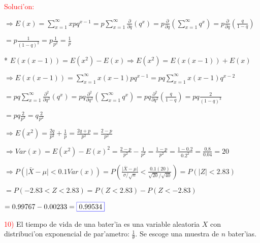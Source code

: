 \documentclass{article}
\providecommand{\abs}[1]{\lvert#1\rvert}
\begin{document}
\textcolor{red}{Soluci'on:}
\vspace{3mm}

$\Longrightarrow E(x) = \sum_{x = 1}^{\infty} xpq^{x-1} = p\sum_{x = 1}^{\infty} \frac{\partial}{\partial q} (q^{x}) = p\frac{\partial}{\partial q} (\sum_{x = 1}^{\infty} q^{x}) = p\frac{\partial}{\partial q} (\frac{q}{1-q})$ 
\vspace{2mm}

$= p\frac{1}{(1-q)^{2}} = p\frac{1}{p^{2}} = \frac{1}{p}$
\vspace{5mm}

* $E(x(x-1)) = E(x^{2})-E(x) \Longrightarrow E(x^{2}) = E(x(x-1)) + E(x)$
\vspace{5mm}

$\Longrightarrow E(x(x-1)) = \sum_{x = 1}^{\infty} x(x-1)pq^{x-1} = pq\sum_{x = 1}^{\infty} x(x-1)q^{x-2}$ 
\vspace{2mm}

$= pq\sum_{x = 1}^{\infty} \frac{\partial^{2}}{\partial q^{2}} (q^{x}) = pq\frac{\partial^{2}}{\partial q^{2}} (\sum_{x = 1}^{\infty} q^{x}) = pq\frac{\partial^{2}}{\partial q^{2}} (\frac{q}{1-q}) = pq\frac{2}{(1-q)^{3}}$ 
\vspace{2mm}

$= pq\frac{2}{p^{3}} = q\frac{2}{p^{2}}$ 
\vspace{5mm}

$\Longrightarrow E(x^{2}) = \frac{2q}{p^{2}} + \frac{1}{p} = \frac{2q+p}{p^{2}} = \frac{2-p}{p^{2}}$
\vspace{4mm}

$\Longrightarrow Var(x) = E(x^{2}) - E(x)^{2} = \frac{2-p}{p^{2}} - \frac{1}{p^{2}} = \frac{1-p}{p^{2}} = \frac{1-0.2}{0.2^{2}} = \frac{0.8}{0.04} = 20$
\vspace{4mm}

$\Longrightarrow P(\abs{\bar{X}-\mu}<0.1Var(x)) =  P(\frac{\abs{\bar{X}-\mu}}{\sigma/\sqrt{n}}<\frac{0.1(20)}{\sqrt{20}/\sqrt{40}}) = P(\abs{Z}<2.83)$
\vspace{3mm}

$= P(-2.83<Z<2.83) = P(Z<2.83)-P(Z<-2.83)$
\vspace{3mm}

$= 0.99767-0.00233 = \fcolorbox{blue}{white}{0.99534}$
\vspace{10mm}

\textcolor{red}{10)} El tiempo de vida de una bater'ia es una variable aleatoria $X$ con distribuci'on exponencial de par'ametro: $\frac{1}{\theta}$. Se escoge una muestra de $n$ bater'ias.
\vspace{0.25mm}
\end{document}
